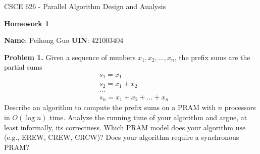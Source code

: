 \documentclass{article}
\theoremstyle{definition}
\newenvironment{problem}[1]{\noindent\textbf{Problem #1.}}{\bigbreak}
\newcommand{\name}[1]{\noindent\textbf{Name}: #1}
\newcommand{\uin}[1]{\noindent\textbf{UIN}: #1\\}
\newcommand{\problemset}[1]{\begin{center}\textbf{Homework #1}\end{center}}
\begin{document}
\begin{center}
{\large
CSCE 626 - Parallel Algorithm Design and Analysis}
\end{center}
\problemset{1}

\begin{center}
\name{ Peihong Guo }
\uin{421003404}
\end{center}


\begin{problem}{1}  Given a sequence of numbers $x_1, x_2, \ldots, x_n$, the prefix sums are the partial sums
\[
\begin{split}
& s_1 = x_1 \\
& s_2 = x_1 + x_2 \\
& \ldots \\
& s_n = x_1 + x_2 + ... + x_n
\end{split}
\]
Describe an algorithm to compute the prefix sums on a PRAM with $n$
processors in $O(\log n)$ time. Analyze the running time of your
algorithm and argue, at least informally, its correctness.
Which PRAM model does your algorithm use (e.g., EREW, CREW, CRCW)?
Does your algorithm require a synchronous PRAM?
\end{problem}
\end{document}
